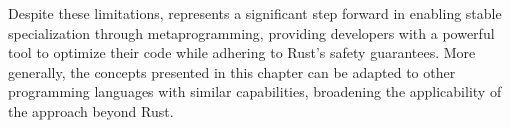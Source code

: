 Despite these limitations, \mytool{} represents a significant step forward in enabling stable specialization through metaprogramming, providing developers with a powerful tool to optimize their code while adhering to Rust's safety guarantees.
More generally, the concepts presented in this chapter can be adapted to other programming languages with similar capabilities, broadening the applicability of the approach beyond Rust.
